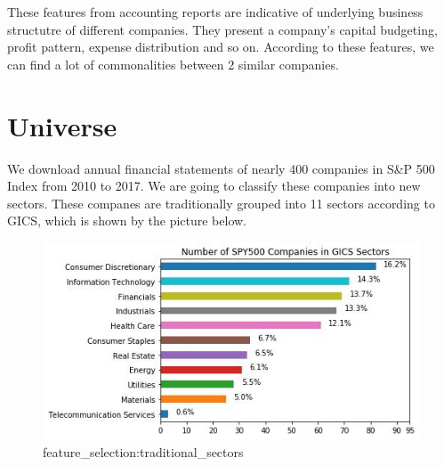 \documentclass[../main.tex]{subfiles}
\begin{document}
These features from accounting reports are indicative of underlying business structutre of different companies. They present a company's capital budgeting, profit pattern, expense distribution and so on. According to these features, we can find a lot of commonalities between 2 similar companies.

\section{Universe}

We download annual financial statements of nearly 400 companies in S\&P 500 Index from 2010 to 2017. We are going to classify these companies into new sectors. These companes are traditionally grouped into 11 sectors according to GICS, which is shown by the picture below.

\begin{figure}[H]
    \includegraphics{images/traditional_sectors.jpeg}
    \caption{feature_selection:traditional_sectors}
    \label{fig:feature_selection:traditional_sectors}
\end{figure}
\end{document}
